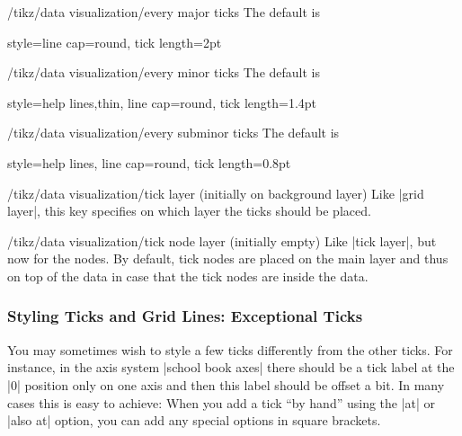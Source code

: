 \begin{stylekey}{/tikz/data visualization/every major ticks}
    The default is
\begin{codeexample}
  style={line cap=round}, tick length=2pt
\end{codeexample}
\end{stylekey}

\begin{stylekey}{/tikz/data visualization/every minor ticks}
    The default is
\begin{codeexample}
  style={help lines,thin, line cap=round}, tick length=1.4pt
\end{codeexample}
\end{stylekey}

\begin{stylekey}{/tikz/data visualization/every subminor ticks}
    The default is
\begin{codeexample}
  style={help lines, line cap=round}, tick length=0.8pt
\end{codeexample}
\end{stylekey}

\begin{stylekey}{/tikz/data visualization/tick layer (initially on background layer)}
    Like |grid layer|, this key specifies on which layer the ticks should be
    placed.
\end{stylekey}

\begin{stylekey}{/tikz/data visualization/tick node layer (initially \normalfont empty)}
    Like |tick layer|, but now for the nodes. By default, tick nodes are placed on the main layer and thus on top of the data in case that the tick nodes are inside the data.
\end{stylekey}


\subsubsection{Styling Ticks and Grid Lines: Exceptional Ticks}

You may sometimes wish to style a few ticks differently from the other ticks. For instance, in the axis system |school book axes| there should be a tick label at the |0| position only on one axis and then this label should be offset a bit. In many cases this is easy to achieve: When you add a tick ``by hand'' using the |at| or |also at| option, you can add any special options in square brackets.

